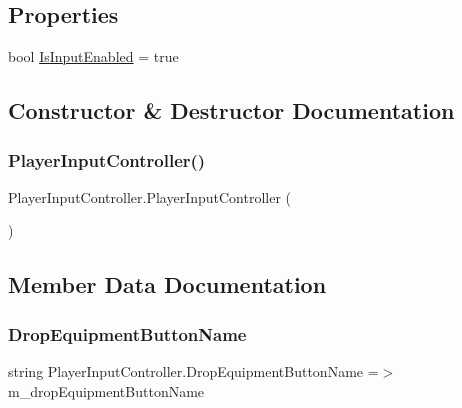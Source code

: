 \subsection*{Properties}
\begin{DoxyCompactItemize}
\item 
bool \mbox{\hyperlink{class_player_input_controller_ad55f46ff15ca7bfc577167007336e5c7}{Is\+Input\+Enabled}} = true
\end{DoxyCompactItemize}


\subsection{Constructor \& Destructor Documentation}
\mbox{\label{class_player_input_controller_a5047ffd4d6676a77673b86f247ded9ec}} 
\subsubsection{\texorpdfstring{Player\+Input\+Controller()}{PlayerInputController()}}
{\footnotesize\ttfamily Player\+Input\+Controller.\+Player\+Input\+Controller (\begin{DoxyParamCaption}{ }\end{DoxyParamCaption})}



\subsection{Member Data Documentation}
\mbox{\label{class_player_input_controller_abc010b188a93dd40f4beb1411ab3fb0d}} 
\subsubsection{\texorpdfstring{Drop\+Equipment\+Button\+Name}{DropEquipmentButtonName}}
{\footnotesize\ttfamily string Player\+Input\+Controller.\+Drop\+Equipment\+Button\+Name =$>$ m\+\_\+drop\+Equipment\+Button\+Name}

